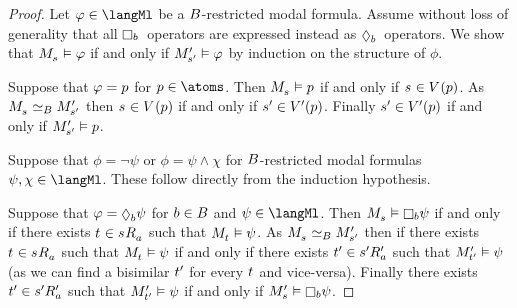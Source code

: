 \begin{proof}
Let $\phi \in \langMl$ be a $B$-restricted modal formula.
Assume without loss of generality that all $\necessaryB$~operators are expressed instead as $\possibleB$~operators.
We show that $\kPModel{\kStateS} \entails \phi$ if and only if ${M^{\prime}_{{s}^{\prime}}} \vDash \varphi$ by induction on the structure of $\phi$.

Suppose that $\varphi = p$ for $\atomP \in \atoms$.
Then $\kPModel{\kStateS} \entails \atomP$ if and only if $\kStateS \in \kValuation(\atomP)$.
As $\kPModel{\kStateS} \bisimilar[\agentsB] \kPModelP{\kStateSP}$ then $\kStateS \in \kValuation(\atomP)$ if and only if ${s}^{\prime} \in {V^{\prime}}(p)$.
Finally ${s}^{\prime} \in {V^{\prime}}(p)$ if and only if ${M^{\prime}_{{s}^{\prime}}} \vDash p$.

Suppose that $\phi = \lnot \psi$ or $\phi = \psi \land \chi$ for $B$-restricted modal formulas $\psi, \chi \in \langMl$.
These follow directly from the induction hypothesis.

Suppose that $\phi = \possible[\agentB] \psi$ for $b \in B$ and $\psi \in \langMl$.
Then $\kPModel{\kStateS} \entails \necessary[\agentB] \psi$ if and only if there exists $\kStateT \in \kSuccessorsA{\kStateS}$ such that $\kPModel{\kStateT} \entails \psi$.
As $\kPModel{\kStateS} \bisimilar[\agentsB] \kPModelP{\kStateSP}$ then if there exists $\kStateT \in \kSuccessorsA{\kStateS}$ such that $\kPModel{\kStateT} \entails \psi$ if and only if there exists ${t}^{\prime} \in {{s}^{\prime}} {R^{\prime}_{a}}$ such that ${M^{\prime}_{{t}^{\prime}}} \vDash \psi$ (as we can find a bisimilar ${t}^{\prime}$ for every $\kStateT$ and vice-versa).
Finally there exists ${t}^{\prime} \in {{s}^{\prime}} {R^{\prime}_{a}}$ such that ${M^{\prime}_{{t}^{\prime}}} \vDash \psi$ if and only if $\kPModelP{\kStateS} \entails \necessary[\agentB] \psi$.
\end{proof}

